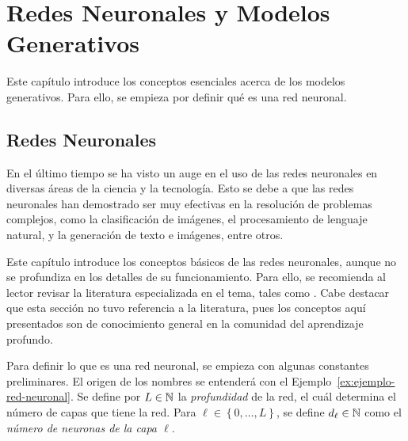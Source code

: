 \chapter{Redes Neuronales y Modelos Generativos}\label{chap:redes-neuronales-y-modelos-generativos}
{
Este capítulo introduce los conceptos esenciales acerca de los modelos generativos. Para ello, se empieza por definir qué es una red neuronal.
\section{Redes Neuronales}\label{sec:redes-Neuronales}
{
    En el último tiempo se ha visto un auge en el uso de las redes neuronales en diversas áreas de la ciencia y la tecnología. Esto se debe a que las redes neuronales han demostrado ser muy efectivas en la resolución de problemas complejos, como la clasificación de imágenes, el procesamiento de lenguaje natural, y la generación de texto e imágenes, entre otros.

    Este capítulo introduce los conceptos básicos de las redes neuronales, aunque no se profundiza en los detalles de su funcionamiento. Para ello, se recomienda al lector revisar la literatura especializada en el tema, tales como \cite{goodfellow2016deep,calin2020deep}. Cabe destacar que esta sección no tuvo referencia a la literatura, pues los conceptos aquí presentados son de conocimiento general en la comunidad del aprendizaje profundo.

    Para definir lo que es una red neuronal, se empieza con algunas constantes preliminares. El origen de los nombres se entenderá con el Ejemplo~\ref{ex:ejemplo-red-neuronal}. Se define por $L\in\mathbb{N}$ la \emph{profundidad} de la red, el cuál determina el número de capas que tiene la red. Para $\ell \in \left\{ 0,\ldots, L \right\}$, se define $d_\ell\in\mathbb{N}$ como el \emph{número de neuronas de la capa $\ell$}.

}}
